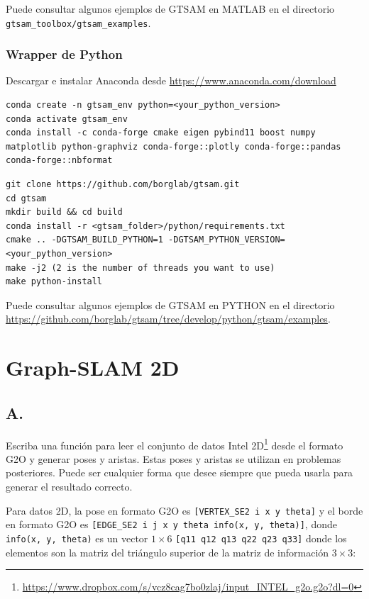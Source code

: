 \documentclass[tp]{lcc}
\begin{document}
Puede consultar algunos ejemplos de GTSAM en MATLAB en el directorio \lstinline[style=bash]{gtsam_toolbox/gtsam_examples}.

\subsubsection*{Wrapper de Python}

Descargar e instalar Anaconda desde \url{https://www.anaconda.com/download}

\begin{lstlisting}[style=bash] 
conda create -n gtsam_env python=<your_python_version>
conda activate gtsam_env
conda install -c conda-forge cmake eigen pybind11 boost numpy matplotlib python-graphviz conda-forge::plotly conda-forge::pandas conda-forge::nbformat
\end{lstlisting}

\begin{lstlisting}[style=bash] 
git clone https://github.com/borglab/gtsam.git
cd gtsam
mkdir build && cd build
conda install -r <gtsam_folder>/python/requirements.txt
cmake .. -DGTSAM_BUILD_PYTHON=1 -DGTSAM_PYTHON_VERSION=<your_python_version>
make -j2 (2 is the number of threads you want to use)
make python-install
\end{lstlisting}

Puede consultar algunos ejemplos de GTSAM en PYTHON en el directorio \url{https://github.com/borglab/gtsam/tree/develop/python/gtsam/examples}.

\section{Graph-SLAM 2D}
\subsection{A.}
Escriba una función para leer el conjunto de datos Intel 2D\footnote{\url{https://www.dropbox.com/s/vcz8cag7bo0zlaj/input_INTEL_g2o.g2o?dl=0}} desde el formato G2O y generar poses y aristas. Estas poses y aristas se utilizan en problemas posteriores. Puede ser cualquier forma que desee siempre que pueda usarla para generar el resultado correcto.

Para datos 2D, la pose en formato G2O es \lstinline[style=bash]{[VERTEX_SE2 i x y theta]} y el borde en formato G2O es \lstinline[style=bash]{[EDGE_SE2 i j x y theta info(x, y, theta)]}, donde \lstinline[style=bash]{info(x, y, theta)} es un vector $1 \times 6$ \lstinline[style=bash]{[q11 q12 q13 q22 q23 q33]} donde los elementos son la matriz del triángulo superior de la matriz de información $3 \times 3$:
\end{document}

